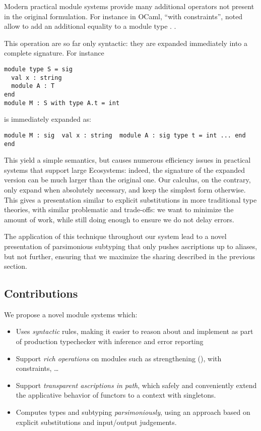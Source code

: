 Modern practical module systems \cite{Rich calculus, etc} provide
many additional operators not present in the original formulation.
For instance in OCaml, ``with constraints'', noted 
allow to add an additional equality to a module type .
.

This operation are so far only syntactic: they are expanded immediately into
a complete signature. For instance 
\begin{verbatim}
module type S = sig 
  val x : string
  module A : T
end
module M : S with type A.t = int
\end{verbatim}

is immediately expanded as:
\begin{verbatim}
module M : sig  val x : string  module A : sig type t = int ... end  end
\end{verbatim}

This yield a simple semantics, but causes numerous efficiency issues in
practical systems that support large Ecosystems: indeed, the signature
of the expanded version can be much larger than the original one.
Our calculus, on the contrary, only expand when absolutely necessary, and keep
the simplest form otherwise. This gives a presentation
similar to explicit substitutions in more traditional type theories, with
similar problematic and trade-offs: we want to minimize the amount of work,
while still doing enough to ensure we do not delay errors.

The application of this technique throughout our system lead to a novel
presentation of parsimonious subtyping that only pushes ascriptions up
to aliases, but not further, ensuring that we maximize the sharing described
in the previous section.


\subsection{Contributions}

We propose a novel module systems which:
\begin{itemize}
\item Uses \emph{syntactic} rules, making it easier to reason about and
  implement as part of production typechecker with inference and error reporting
\item Support \emph{rich operations} on modules such as strengthening (\cite{XL}),
  with constraints, \dots  
\item Support \emph{transparent ascriptions in path}, which safely and
  conveniently extend
  the applicative behavior of functors to a context with singletons.
\item Computes types and subtyping \emph{parsimoniously},
  using an approach based on explicit substitutions and input/output judgements.
\end{itemize}



